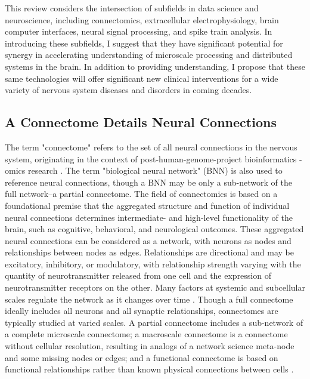 \documentclass[11pt]{article}
\newcommand{\subsectionwithindent}[1]{
    \subsection*{#1}
    \hspace{\parindent} %
}
\begin{document}
This review considers the intersection of subfields in data science and neuroscience, including connectomics, extracellular electrophysiology, brain computer interfaces, neural signal processing, and spike train analysis. In introducing these subfields, I suggest that they have significant potential for synergy in accelerating understanding of microscale processing and distributed systems in the brain. In addition to providing understanding, I propose that these same technologies will offer significant new clinical interventions for a wide variety of nervous system diseases and disorders in coming decades.

\subsectionwithindent{A Connectome Details Neural Connections}
The term "connectome" refers to the set of all neural connections in the nervous system, originating in the context of post-human-genome-project bioinformatics -omics research \cite{ciarrusta2023connectome, mahapatra2010omics, green2015hgp}. The term "biological neural network" (BNN) \cite{yamazaki2022spiking} is also used to reference neural connections, though a BNN may be only a sub-network of the full network--a partial connectome. The field of connectomics is based on a foundational premise that the aggregated structure and function of individual neural connections determines intermediate- and high-level functionality of the brain, such as cognitive, behavioral, and neurological outcomes. These aggregated neural connections can be considered as a network, with neurons as nodes and relationships between nodes as edges. Relationships are directional and may be excitatory, inhibitory, or modulatory, with relationship strength varying with the quantity of neurotransmitter released from one cell and the expression of neurotransmitter receptors on the other. Many factors at systemic and subcellular scales regulate the network as it changes over time \cite{ciarrusta2023connectome}. Though a full connectome ideally includes all neurons and all synaptic relationships, connectomes are typically studied at varied scales. A partial connectome includes a sub-network of a complete microscale connectome; a macroscale connectome is a connectome without cellular resolution, resulting in analogs of a network science meta-node and some missing nodes or edges; and a functional connectome is based on functional relationships rather than known physical connections between cells \cite{baxter2023functionalconnectome, blommaert2023structuralconnectome, ciarrusta2023connectome, sejnowski2016nanoconnectomics, elam2021hcp}.
\end{document}
